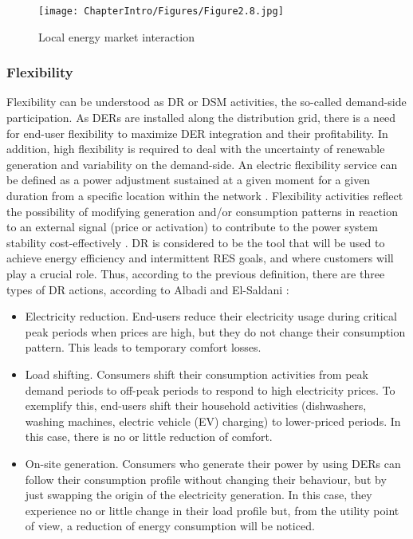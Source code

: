 \begin{figure}[]
	\centering
	\texttt{[image: ChapterIntro/Figures/Figure2.8.jpg]}
		\caption{Local energy market interaction}  
	\label{fig:marketinteraction}
\end{figure}


\subsubsection{Flexibility}
Flexibility can be understood as DR or DSM activities, the so-called demand-side participation. As DERs are installed along the distribution grid, there is a need for end-user flexibility to maximize DER integration and their profitability. In addition, high flexibility is required to deal with the uncertainty of renewable generation and variability on the demand-side. An electric flexibility service can be defined as a power adjustment sustained at a given moment for a given duration from a specific location within the network \cite{Lee2015}. Flexibility activities reflect the possibility of modifying generation and/or consumption patterns in reaction to an external signal (price or activation) to contribute to the power system stability cost-effectively \cite{VILLAR2018Flexibility}. DR is considered to be the tool that will be used to achieve energy efficiency and intermittent RES goals, and where customers will play a crucial role. Thus, according to the previous definition, there are three types of DR actions, according to Albadi and El-Saldani \cite{albadi2008summary}:

\begin{itemize}
\item Electricity reduction. End-users reduce their electricity usage during critical peak periods when prices are
high, but they do not change their consumption pattern. This leads to temporary comfort losses. 
\item Load shifting. Consumers shift their consumption activities from peak demand periods to off-peak periods to respond to high electricity prices. To exemplify this, end-users shift their household activities (dishwashers, washing machines, electric vehicle (EV) charging) to lower-priced periods. In this case, there is no or little reduction of comfort. 
\item On-site generation. Consumers who generate their power by using DERs can follow their consumption profile without changing their behaviour, but by just swapping the origin of the electricity generation. In this case, they experience no or little change in their load profile but, from the utility point of view, a reduction of energy consumption will be noticed.
\end{itemize}

